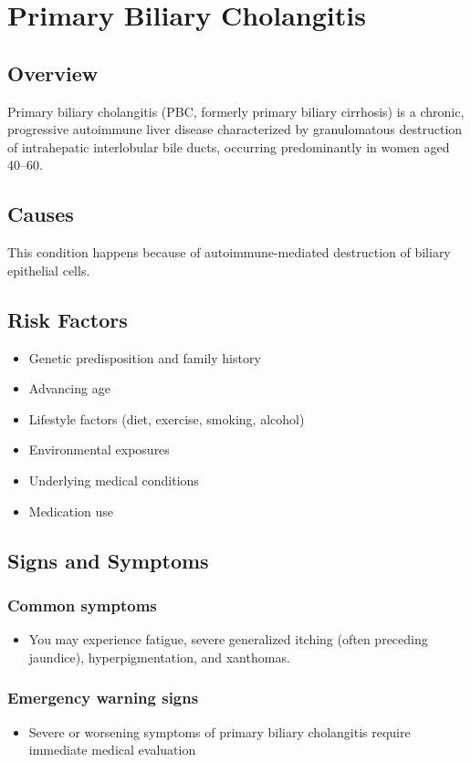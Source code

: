 \chapter{Primary Biliary Cholangitis}
\label{sec:Primary Biliary Cholangitis}

\section{Overview}
Primary biliary cholangitis (PBC, formerly primary biliary cirrhosis) is a chronic, progressive autoimmune liver disease characterized by granulomatous destruction of intrahepatic interlobular bile ducts, occurring predominantly in women aged 40--60.
\section{Causes}
This condition happens because of autoimmune-mediated destruction of biliary epithelial cells.     
\section{Risk Factors}

\begin{itemize}[noitemsep]
  \item Genetic predisposition and family history
  \item Advancing age
  \item Lifestyle factors (diet, exercise, smoking, alcohol)
  \item Environmental exposures
  \item Underlying medical conditions
  \item Medication use
\end{itemize}
\section{Signs and Symptoms}

\subsection{Common symptoms}
\begin{itemize}[noitemsep]
  \item You may experience fatigue, severe generalized itching (often preceding jaundice), hyperpigmentation, and xanthomas. 
  \end{itemize}

\subsection{Emergency warning signs}
\begin{itemize}[noitemsep]
  \item Severe or worsening symptoms of primary biliary cholangitis require immediate medical evaluation
\end{itemize}
